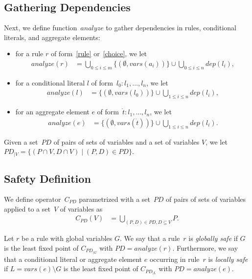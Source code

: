 \documentclass{article}
\newcommand{\tuple}[1]{\dot{#1}}
\newcommand{\set}[1]{\{#1\}}
\newcommand\Vars{\mathit{vars}}
\newcommand\ProDep{\mathit{dep}}
\newcommand\Analyze{\mathit{analyze}}
\newcommand\PD{\mathit{P\!D}}
\newcommand\CheckOp[1]{C_{#1}}
\begin{document}
\subsection{Gathering Dependencies}
	Next, we define function~$\Analyze$ to gather dependencies in rules, conditional literals, and aggregate elements:
	\begin{itemize}
		\item
			for a rule $r$ of form~\eqref{rule} or~\eqref{choice}, we let
			\begin{align*}
				\Analyze(r) &= \bigcup_{0 \leq i \leq m} \set{(\emptyset, \Vars(a_i))} \cup \bigcup_{0 \leq i \leq n} \ProDep(l_i),
			\end{align*}
		\item
			for a conditional literal $l$ of form~$l_0 : l_1, \dots, l_n$, we let
			\begin{align*}
				\Analyze(l) &= \set{(\emptyset, \Vars(l_0))} \cup \bigcup_{1 \leq i \leq n} \ProDep(l_i),
			\end{align*}
		\item
			for an aggregate element $e$ of form~$\tuple{t}: l_1, \dots, l_n$, we let
			\begin{align*}
				\Analyze(e) &= \set{(\emptyset, \Vars(\tuple{t}))} \cup \bigcup_{1 \leq i \leq n} \ProDep(l_i).
			\end{align*}
	\end{itemize}
	Given a set~$\PD$ of pairs of sets of variables and a set of variables $V$, we let $\PD_{|V} = \set{(P \cap V, D \cap V) \mid (P, D) \in \PD}$.


	\subsection{Safety Definition}
	We define operator~$\CheckOp{\PD}$ parametrized with a set~$\PD$ of pairs of sets of variables
	applied to a set~$V$ of variables as
	\begin{align*}
	\CheckOp{\PD}(V) &= \bigcup_{(P,D) \in \PD, D \subseteq V} P.
	\end{align*}

	Let $r$ be a rule with global variables $G$.
	We say that a rule~$r$ is \emph{globally safe}
	if $G$ is the least fixed point of $\CheckOp{\PD_{|G}}$ with $\PD=\Analyze(r)$.
	Furthermore, we say that a conditional literal or aggregate element $e$ occurring in rule~$r$ is \emph{locally safe}
	if $L = \Vars(e) \setminus G$ is the least fixed point of $\CheckOp{\PD_{|L}}$ with $\PD=\Analyze(e)$.
\end{document}

